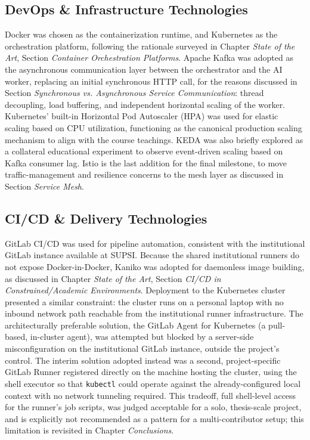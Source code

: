 \documentclass[twoside]{supsistudent}
\begin{document}
\subsection{DevOps \& Infrastructure Technologies}
Docker was chosen as the containerization runtime, and Kubernetes as the orchestration platform, following the rationale surveyed in Chapter \emph{State of the Art}, Section \emph{Container Orchestration Platforms}. Apache Kafka was adopted as the asynchronous communication layer between the orchestrator and the AI worker, replacing an initial synchronous HTTP call, for the reasons discussed in Section \emph{Synchronous vs. Asynchronous Service Communication}: thread decoupling, load buffering, and independent horizontal scaling of the worker. Kubernetes' built-in Horizontal Pod Autoscaler (HPA) was used for elastic scaling based on CPU utilization, functioning as the canonical production scaling mechanism to align with the course teachings. KEDA was also briefly explored as a collateral educational experiment to observe event-driven scaling based on Kafka consumer lag. Istio is the last addition for the final milestone, to move traffic-management and resilience concerns to the mesh layer as discussed in Section \emph{Service Mesh}.

\subsection{CI/CD \& Delivery Technologies}
GitLab CI/CD was used for pipeline automation, consistent with the institutional GitLab instance available at SUPSI. Because the shared institutional runners do not expose Docker-in-Docker, Kaniko was adopted for daemonless image building, as discussed in Chapter \emph{State of the Art}, Section \emph{CI/CD in Constrained/Academic Environments}. Deployment to the Kubernetes cluster presented a similar constraint: the cluster runs on a personal laptop with no inbound network path reachable from the institutional runner infrastructure. The architecturally preferable solution, the GitLab Agent for Kubernetes (a pull-based, in-cluster agent), was attempted but blocked by a server-side misconfiguration on the institutional GitLab instance, outside the project's control. The interim solution adopted instead was a second, project-specific GitLab Runner registered directly on the machine hosting the cluster, using the shell executor so that \texttt{kubectl} could operate against the already-configured local context with no network tunneling required. This tradeoff, full shell-level access for the runner's job scripts, was judged acceptable for a solo, thesis-scale project, and is explicitly not recommended as a pattern for a multi-contributor setup; this limitation is revisited in Chapter \emph{Conclusions}.
\end{document}

